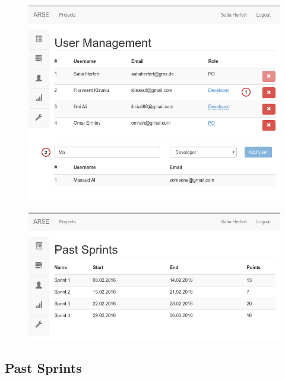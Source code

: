 \documentclass[
	accentcolor=tud1a %
]{tudreport}
\begin{document}
\begin{figure}[ht]
\centering
\begin{minipage}{.5\textwidth}
  \centering
  	\includegraphics[height=15EM]{img/usermgmt}
  	\label{fig:project-user-management}
\end{minipage}%
\begin{minipage}{.5\textwidth}
	\centering
	\includegraphics[height=15EM]{img/pastsprints}
	\label{fig:project-past-sprints}
\end{minipage}
\end{figure}

\subsection{Past Sprints}
\label{sec:past-spints}

\end{document}
